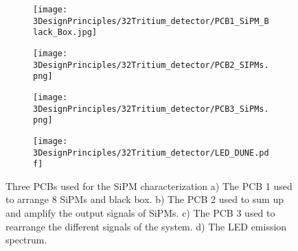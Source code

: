 \begin{figure}
\centering
    \begin{subfigure}[b]{0.5\textwidth}
    \centering
    \texttt{[image: 3DesignPrinciples/32Tritium\_detector/PCB1\_SiPM\_Black\_Box.jpg]}  
    \caption{\label{subfig:PCB1}}
    \end{subfigure}
    \hfill
    \begin{subfigure}[b]{0.45\textwidth}
    \centering
    \texttt{[image: 3DesignPrinciples/32Tritium\_detector/PCB2\_SIPMs.png]}  
    \caption{\label{subfig:PCB2}}
    \end{subfigure}
    \hfill
    \begin{subfigure}[b]{0.4\textwidth}
    \centering
    \texttt{[image: 3DesignPrinciples/32Tritium\_detector/PCB3\_SiPMs.png]}  
    \caption{\label{subfig:PCB3}}
    \end{subfigure}
    \hfill
    \begin{subfigure}[b]{0.5\textwidth}
    \centering
    \texttt{[image: 3DesignPrinciples/32Tritium\_detector/LED\_DUNE.pdf]}  
    \caption{\label{subfig:LEDSpectrum}}
    \end{subfigure}
 \caption{Three PCBs used for the SiPM characterization a) The PCB 1 used to arrange 8 SiPMs and black box. b) The PCB 2 used to sum up and amplify the output signals of SiPMs. c) The PCB 3 used to rearrange the different signals of the system. d) The LED emission spectrum.}
 \label{fig:PCBs_LEDSpectrum}
\end{figure}